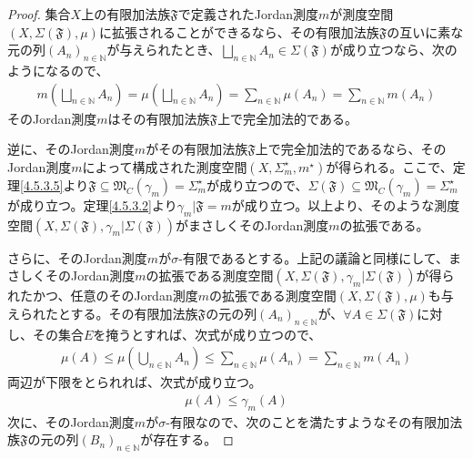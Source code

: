 \documentclass[dvipdfmx]{jsarticle}
\begin{document}
\begin{proof}
集合$X$上の有限加法族$\mathfrak{F}$で定義されたJordan測度$m$が測度空間$\left( X,\varSigma\left( \mathfrak{F} \right),\mu \right)$に拡張されることができるなら、その有限加法族$\mathfrak{F}$の互いに素な元の列$\left( A_{n} \right)_{n \in \mathbb{N}}$が与えられたとき、$\bigsqcup_{n \in \mathbb{N}} A_{n} \in \varSigma\left( \mathfrak{F} \right)$が成り立つなら、次のようになるので、
\begin{align*}
m\left( \bigsqcup_{n \in \mathbb{N}} A_{n} \right) = \mu\left( \bigsqcup_{n \in \mathbb{N}} A_{n} \right) = \sum_{n \in \mathbb{N}} {\mu\left( A_{n} \right)} = \sum_{n \in \mathbb{N}} {m\left( A_{n} \right)}
\end{align*}
そのJordan測度$m$はその有限加法族$\mathfrak{F}$上で完全加法的である。\par
逆に、そのJordan測度$m$がその有限加法族$\mathfrak{F}$上で完全加法的であるなら、そのJordan測度$m$によって構成された測度空間$\left( X,\varSigma_{m}^{\star},m^{\star} \right)$が得られる。ここで、定理\ref{4.5.3.5}より$\mathfrak{F \subseteq}\mathfrak{M}_{C}\left( \gamma_{m} \right) = \varSigma_{m}^{\star}$が成り立つので、$\varSigma\left( \mathfrak{F} \right) \subseteq \mathfrak{M}_{C}\left( \gamma_{m} \right) = \varSigma_{m}^{\star}$が成り立つ。定理\ref{4.5.3.2}より$\gamma_{m}\mathfrak{|F} =m$が成り立つ。以上より、そのような測度空間$\left( X,\varSigma\left( \mathfrak{F} \right),\gamma_{m}|\varSigma\left( \mathfrak{F} \right) \right)$がまさしくそのJordan測度$m$の拡張である。\par
さらに、そのJordan測度$m$が$\sigma$-有限であるとする。上記の議論と同様にして、まさしくそのJordan測度$m$の拡張である測度空間$\left( X,\varSigma\left( \mathfrak{F} \right),\gamma_{m}|\varSigma\left( \mathfrak{F} \right) \right)$が得られたかつ、任意のそのJordan測度$m$の拡張である測度空間$\left( X,\varSigma\left( \mathfrak{F} \right),\mu \right)$も与えられたとする。その有限加法族$\mathfrak{F}$の元の列$\left( A_{n} \right)_{n \in \mathbb{N}}$が、$\forall A \in \varSigma\left( \mathfrak{F} \right)$に対し、その集合$E$を掩うとすれば、次式が成り立つので、
\begin{align*}
\mu(A) \leq \mu\left( \bigcup_{n \in \mathbb{N}} A_{n} \right) \leq \sum_{n \in \mathbb{N}} {\mu\left( A_{n} \right)} = \sum_{n \in \mathbb{N}} {m\left( A_{n} \right)}
\end{align*}
両辺が下限をとられれば、次式が成り立つ。
\begin{align*}
\mu(A) \leq \gamma_{m}(A)
\end{align*}
次に、そのJordan測度$m$が$\sigma$-有限なので、次のことを満たすようなその有限加法族$\mathfrak{F}$の元の列$\left( B_{n} \right)_{n \in \mathbb{N}}$が存在する。

\end{proof}
\end{document}
